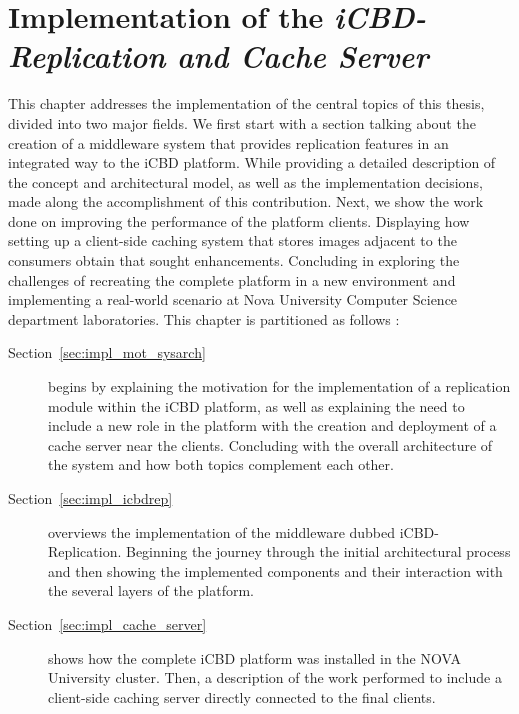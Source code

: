 \chapter{Implementation of the \textit{iCBD-Replication and Cache Server}}
\label{cha:impl_replication_caching}

This chapter addresses the implementation of the central topics of this thesis, divided into two major fields.
We first start with a section talking about the creation of a middleware system that provides replication features in an integrated way to the iCBD platform. While providing a detailed description of the concept and architectural model, as well as the implementation decisions, made along the accomplishment of this contribution.
Next, we show the work done on improving the performance of the platform clients. Displaying how setting up a client-side caching system that stores images adjacent to the consumers obtain that sought enhancements. Concluding in exploring the challenges of recreating the complete platform in a new environment and implementing a real-world scenario at Nova University Computer Science department laboratories. This chapter is partitioned as follows :


\begin{description}
	\item [Section~\ref{sec:impl_mot_sysarch}] begins by explaining the motivation for the implementation of a replication module within the iCBD platform, as well as explaining the need to include a new role in the platform with the creation and deployment of a cache server near the clients. Concluding with the overall architecture of the system and how both topics complement each other.
    \item [Section~\ref{sec:impl_icbdrep}] overviews the implementation of the middleware dubbed iCBD-Replication. Beginning the journey through the initial architectural process and then showing the implemented components and their interaction with the several layers of the platform.
    \item [Section~\ref{sec:impl_cache_server}] shows how the complete iCBD platform was installed in the NOVA University cluster. Then, a description of the work performed to include a client-side caching server directly connected to the final clients.
\end{description}
\newpage

